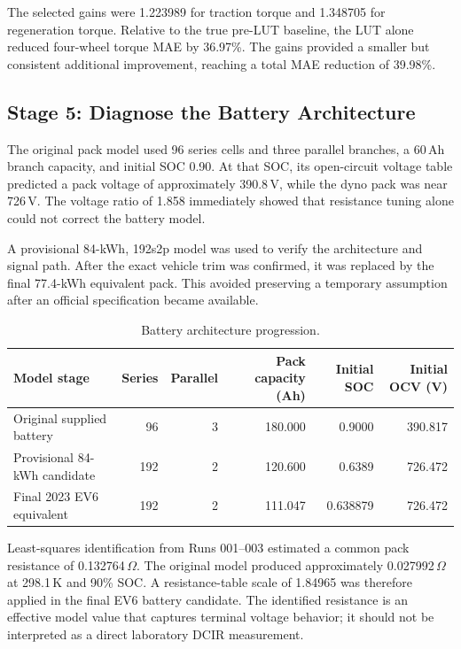 \documentclass[11pt,letterpaper]{article}
\newcommand{\SI}[2]{#1\,#2}
\newcommand{\ohm}{\ensuremath{\Omega}}
\begin{document}
The selected gains were 1.223989 for traction torque and 1.348705 for
regeneration torque. Relative to the true pre-LUT baseline, the LUT alone
reduced four-wheel torque MAE by 36.97\%. The gains provided a smaller but
consistent additional improvement, reaching a total MAE reduction of 39.98\%.

\subsection{Stage 5: Diagnose the Battery Architecture}

The original pack model used 96 series cells and three parallel branches, a
\SI{60}{Ah} branch capacity, and initial SOC 0.90. At that SOC, its open-circuit
voltage table predicted a pack voltage of approximately \SI{390.8}{V}, while
the dyno pack was near \SI{726}{V}. The voltage ratio of 1.858 immediately
showed that resistance tuning alone could not correct the battery model.

A provisional 84-kWh, 192s2p model was used to verify the architecture and
signal path. After the exact vehicle trim was confirmed, it was replaced by the
final 77.4-kWh equivalent pack. This avoided preserving a temporary assumption
after an official specification became available.

\begin{table}[H]
\centering
\caption{Battery architecture progression.}
\begin{tabularx}{\textwidth}{Yrrrrr}
\toprule
Model stage & Series & Parallel & Pack capacity (Ah) & Initial SOC & Initial OCV (V) \\
\midrule
Original supplied battery & 96 & 3 & 180.000 & 0.9000 & 390.817 \\
Provisional 84-kWh candidate & 192 & 2 & 120.600 & 0.6389 & 726.472 \\
Final 2023 EV6 equivalent & 192 & 2 & 111.047 & 0.638879 & 726.472 \\
\bottomrule
\end{tabularx}
\end{table}

Least-squares identification from Runs 001--003 estimated a common pack
resistance of \SI{0.132764}{\ohm}. The original model produced approximately
\SI{0.027992}{\ohm} at \SI{298.1}{K} and 90\% SOC. A resistance-table scale of
1.84965 was therefore applied in the final EV6 battery candidate. The
identified resistance is an effective model value that captures terminal
voltage behavior; it should not be interpreted as a direct laboratory DCIR
measurement.
\end{document}
